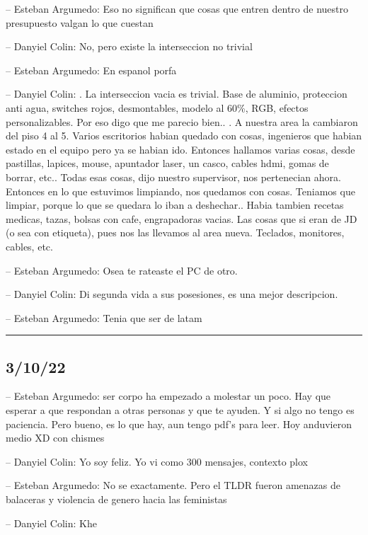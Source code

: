 -- Esteban Argumedo: Eso no significan que cosas que entren dentro de
nuestro presupuesto valgan lo que cuestan

-- Danyiel Colin: No, pero existe la interseccion no trivial

-- Esteban Argumedo: En espanol porfa

-- Danyiel Colin: . La interseccion vacia es trivial. Base de aluminio,
proteccion anti agua, switches rojos, desmontables, modelo al 60\%, RGB,
efectos personalizables. Por eso digo que me parecio bien.. . A nuestra
area la cambiaron del piso 4 al 5. Varios escritorios habian quedado con
cosas, ingenieros que habian estado en el equipo pero ya se habian ido.
Entonces hallamos varias cosas, desde pastillas, lapices, mouse,
apuntador laser, un casco, cables hdmi, gomas de borrar, etc.. Todas
esas cosas, dijo nuestro supervisor, nos pertenecian ahora. Entonces en
lo que estuvimos limpiando, nos quedamos con cosas. Teniamos que
limpiar, porque lo que se quedara lo iban a deshechar.. Habia tambien
recetas medicas, tazas, bolsas con cafe, engrapadoras vacias. Las cosas
que si eran de JD (o sea con etiqueta), pues nos las llevamos al area
nueva. Teclados, monitores, cables, etc.

-- Esteban Argumedo: Osea te rateaste el PC de otro.

-- Danyiel Colin: Di segunda vida a sus posesiones, es una mejor
descripcion.

-- Esteban Argumedo: Tenia que ser de latam

\begin{center}\rule{0.5\linewidth}{0.5pt}\end{center}

\hypertarget{section-29}{%
\subsection{3/10/22}\label{section-29}}

-- Esteban Argumedo: ser corpo ha empezado a molestar un poco. Hay que
esperar a que respondan a otras personas y que te ayuden. Y si algo no
tengo es paciencia. Pero bueno, es lo que hay, aun tengo pdf's para
leer. Hoy anduvieron medio XD con chismes

-- Danyiel Colin: Yo soy feliz. Yo vi como 300 mensajes, contexto plox

-- Esteban Argumedo: No se exactamente. Pero el TLDR fueron amenazas de
balaceras y violencia de genero hacia las feministas

-- Danyiel Colin: Khe

